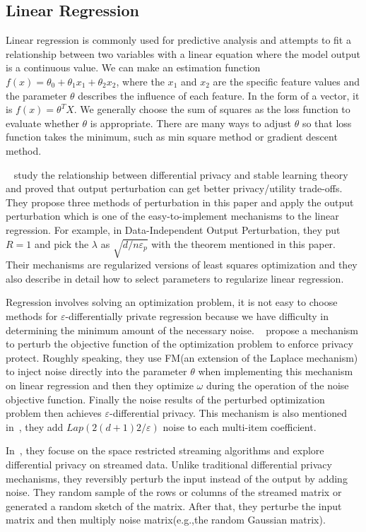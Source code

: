 \documentclass[draftclsnofoot,onecolumn,twoside]{IEEEtran}
\begin{document}
\subsection{Linear Regression}

Linear regression is commonly used for predictive analysis and attempts to fit a relationship between two variables with a linear equation where the model output is a continuous value. We can make an estimation function $f(x)=\theta_{0}+\theta_{1}x_{1}+\theta_{2}x_{2}$, where the $x_{1}$ and $x_{2}$ are the specific feature values and the parameter $\theta$ describes the influence of each feature. In the form of a vector, it is $f(x)=\theta^{T}X$. We generally choose the sum of squares as the loss function to evaluate whether $\theta$ is appropriate. There are many ways to adjust $\theta$ so that loss function takes the minimum, such as min square method or gradient descent method.


~\cite{Wu2015Revisiting} study the relationship between differential privacy and stable learning theory and proved that output perturbation can get better privacy/utility trade-offs. They propose three methods of perturbation in this paper and apply the output perturbation which is one of the easy-to-implement mechanisms to the linear regression. For example, in Data-Independent Output Perturbation, they put $R = 1$ and pick the $\lambda$ as $\sqrt{d/n\varepsilon_p}$ with the theorem mentioned in this paper. Their mechanisms are regularized versions of least squares optimization and they also describe in detail how to select parameters to regularize linear regression.


Regression involves solving an optimization problem, it is not easy to choose methods for $\varepsilon$-differentially private regression because we have difficulty in determining the minimum amount of the necessary noise. ~\cite{Zhang2012Functional} propose a mechanism to perturb the objective function of the optimization problem to enforce privacy protect. Roughly speaking, they use FM(an extension of the Laplace mechanism) to inject noise directly into the parameter $\theta$ when implementing this mechanism on linear regression and then they optimize $\omega$ during the operation of the noise objective function. Finally the noise results of the perturbed optimization problem then achieves $\varepsilon$-differential privacy.
This mechanism is also mentioned in~\cite{Wang2016Based}, they add $Lap(2(d + 1)2/\varepsilon)$ noise to each multi-item coefficient.


In~\cite{Upadhyay2017Differentially}, they focuse on the space restricted streaming algorithms and explore differential privacy on streamed data. Unlike traditional differential privacy mechanisms, they reversibly perturb the input instead of the output by adding noise. They random sample of the rows or columns of the streamed matrix or generated a random sketch of the matrix. After that, they perturbe the input matrix and then multiply noise matrix(e.g.,the random Gaussian matrix).
\end{document}
